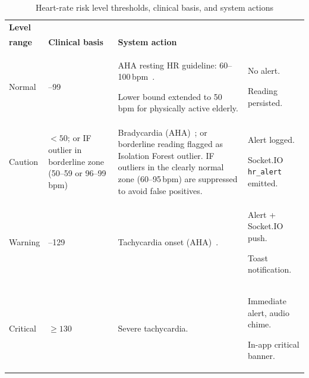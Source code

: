 \begin{table}[H]
\centering
\caption[Heart-rate risk level thresholds]{Heart-rate risk level thresholds, clinical basis, and system actions}
\label{tab:risk}
\small
\begin{tabularx}{\textwidth}{@{} l >{\RaggedRight\arraybackslash}p{2.2cm}
                                   >{\hsize=1.1\hsize\RaggedRight\arraybackslash}X
                                   >{\hsize=0.9\hsize\RaggedRight\arraybackslash}X @{}}
\toprule
\textbf{Level} & \makecell[l]{\textbf{BPM}\\\textbf{range}} & \textbf{Clinical basis} & \textbf{System action} \\
\midrule
Normal   & 50--99 &
  \begin{tblitem}
    \item AHA resting HR guideline: 60--100\,bpm~\cite{AHA2024}.
    \item Lower bound extended to 50\,bpm for physically active elderly.
  \end{tblitem} &
  \begin{tblitem}
    \item No alert.
    \item Reading persisted.
  \end{tblitem} \\
\addlinespace[4pt]
Caution  & $<50$; or IF outlier in borderline zone (50--59 or 96--99\,bpm) & Bradycardia (AHA)~\cite{AHA2024}; or borderline reading flagged as Isolation Forest outlier. IF outliers in the clearly normal zone (60--95\,bpm) are suppressed to avoid false positives. &
  \begin{tblitem}
    \item Alert logged.
    \item Socket.IO \mbox{\texttt{hr\_alert}} emitted.
  \end{tblitem} \\
\addlinespace[4pt]
Warning  & 100--129 & Tachycardia onset (AHA)~\cite{AHA2024}. &
  \begin{tblitem}
    \item Alert + Socket.IO push.
    \item Toast notification.
  \end{tblitem} \\
\addlinespace[4pt]
Critical & $\geq 130$ &
  \begin{tblitem}
    \item Severe tachycardia.
  \end{tblitem} &
  \begin{tblitem}
    \item Immediate alert, audio chime.
    \item In-app critical banner.
  \end{tblitem} \\
\bottomrule
\end{tabularx}
\end{table}

